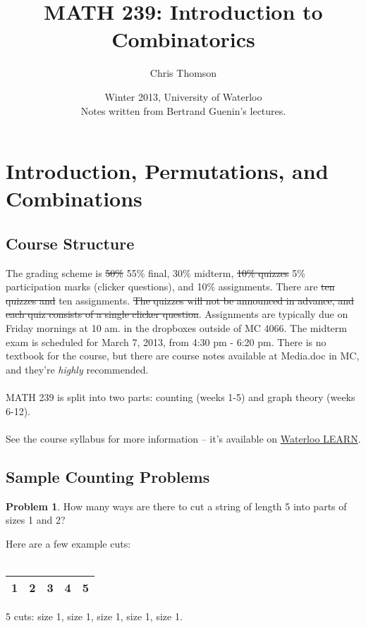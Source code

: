 \documentclass[]{article}
\theoremstyle{definition}
\newtheorem{problem}{Problem}[section]
\newcommand{\lecture}[1]{\marginpar{{\footnotesize $\leftarrow$ \underline{#1}}}}
\begin{document}
	\title{\bf{MATH 239: Introduction to Combinatorics}}
	\date{Winter 2013, University of Waterloo \\ \center Notes written from Bertrand Guenin's lectures.}
	\author{Chris Thomson}
	\maketitle
	\newpage
	
	\section{Introduction, Permutations, and Combinations} \lecture{January 7, 2013}
		\subsection{Course Structure}
			The grading scheme is \st{50\%} 55\% final, 30\% midterm, \st{10\% quizzes} 5\% participation marks (clicker questions), and 10\% assignments. There are \st{ten quizzes and} ten assignments. \st{The quizzes will not be announced in advance, and each quiz consists of a single clicker question}. Assignments are typically due on Friday mornings at 10 am. in the dropboxes outside of MC 4066. The midterm exam is scheduled for March 7, 2013, from 4:30 pm - 6:20 pm. There is no textbook for the course, but there are course notes available at Media.doc in MC, and they're \emph{highly} recommended.
			\\ \\
			MATH 239 is split into two parts: counting (weeks 1-5) and graph theory (weeks 6-12).
			\\ \\
			See the course syllabus for more information -- it's available on \href{https://learn.uwaterloo.ca/}{Waterloo LEARN}.

		\subsection{Sample Counting Problems}
			\begin{problem}
				How many ways are there to cut a string of length 5 into parts of sizes 1 and 2?
			\end{problem}
		
			Here are a few example cuts:
			\\ \\
			\begin{tabular}{|c|c|c|c|c|}
				\hline
				1 & 2 & 3 & 4 & 5 \\
				\hline
			\end{tabular}
			5 cuts: size 1, size 1, size 1, size 1, size 1.
\end{document}
